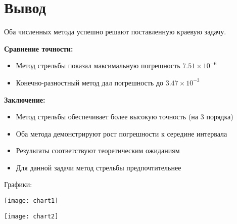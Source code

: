 \section*{Вывод}

Оба численных метода успешно решают поставленную краевую задачу.

\textbf{Сравнение точности:}
\begin{itemize}
\item Метод стрельбы показал максимальную погрешность $7.51 \times 10^{-6}$
\item Конечно-разностный метод дал погрешность до $3.47 \times 10^{-3}$
\end{itemize}

\textbf{Заключение:}
\begin{itemize}
\item Метод стрельбы обеспечивает более высокую точность (на 3 порядка)
\item Оба метода демонстрируют рост погрешности к середине интервала
\item Результаты соответствуют теоретическим ожиданиям
\item Для данной задачи метод стрельбы предпочтительнее
\end{itemize}

Графики:

\texttt{[image: chart1]}

\texttt{[image: chart2]}

\pagebreak
